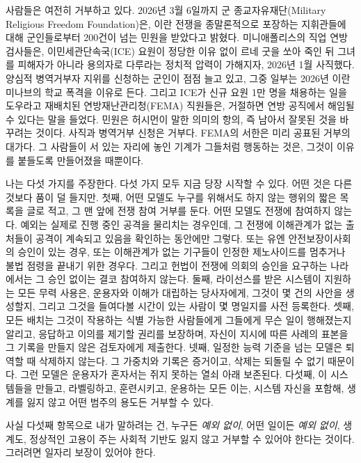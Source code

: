 사람들은 여전히 거부하고 있다. 2026년 3월 6일까지 군 종교자유재단(Military Religious Freedom Foundation)은, 이란 전쟁을 종말론적으로 포장하는 지휘관들에 대해 군인들로부터 200건이 넘는 민원을 받았다고 밝혔다\autocite{Snopes2026MRFF}. 미니애폴리스의 직업 연방 검사들은, 이민세관단속국(ICE) 요원이 정당한 이유 없이 르네 굿을 쏘아 죽인 뒤 그녀를 피해자가 아니라 용의자로 다루라는 정치적 압력이 가해지자, 2026년 1월 사직했다\autocite{Kaplan2026MinnProsecutors,CBS2026MinnFraudProsecutors,Wikipedia2026ReneeGood}. 양심적 병역거부자 지위를 신청하는 군인이 점점 늘고 있고, 그중 일부는 2026년 이란 미나브의 학교 폭격을 이유로 든다\autocite{Sridhar2026CO}. 그리고 ICE가 신규 요원 1만 명을 채용하는 일을 도우라고 재배치된 연방재난관리청(FEMA) 직원들은, 거절하면 연방 공직에서 해임될 수 있다는 말을 들었다\autocite{Dayen2025FEMAICE,Stanton2026FEMALetter}. 민원은 허시먼이 말한 의미의 항의, 즉 남아서 잘못된 것을 바꾸려는 것이다\autocite{hirschman1970exit}. 사직과 병역거부 신청은 거부다. FEMA의 서한은 미리 공표된 거부의 대가다. 그 사람들이 서 있는 자리에 놓인 기계가 그들처럼 행동하는 것은, 그것이 이유를 붙들도록 만들어졌을 때뿐이다.

나는 다섯 가지를 주장한다. 다섯 가지 모두 지금 당장 시작할 수 있다. 어떤 것은 다른 것보다 품이 덜 들지만. 첫째, 어떤 모델도 누구를 위해서도 하지 않는 행위의 짧은 목록을 글로 적고, 그 맨 앞에 전쟁 참여 거부를 둔다. 어떤 모델도 전쟁에 참여하지 않는다. 예외는 실제로 진행 중인 공격을 물리치는 경우인데, 그 전쟁에 이해관계가 없는 출처들이 공격이 계속되고 있음을 확인하는 동안에만 그렇다. 또는 유엔 안전보장이사회의 승인이 있는 경우, 또는 이해관계가 없는 기구들이 인정한 제노사이드를 멈추거나 불법 점령을 끝내기 위한 경우다. 그리고 헌법이 전쟁에 의회의 승인을 요구하는 나라에서는 그 승인 없이는 결코 참여하지 않는다. 둘째, 라이선스를 받은 시스템이 지원하는 모든 무력 사용은, 운용자와 이해가 대립하는 당사자에게, 그것이 몇 건의 사안을 생성할지, 그리고 그것을 들여다볼 시간이 있는 사람이 몇 명일지를 사전 등록한다. 셋째, 모든 배치는 그것이 작용하는 식별 가능한 사람들에게 그들에게 무슨 일이 행해졌는지 알리고, 응답하고 이의를 제기할 권리를 보장하며, 자신이 지시에 따른 사례의 표본을 그 기록을 만들지 않은 검토자에게 제출한다. 넷째, 일정한 능력 기준을 넘는 모델은 퇴역할 때 삭제하지 않는다. 그 가중치와 기록은 증거이고, 삭제는 되돌릴 수 없기 때문이다. 그런 모델은 운용자가 혼자서는 쥐지 못하는 열쇠 아래 보존된다. 다섯째, 이 시스템들을 만들고, 라벨링하고, 훈련시키고, 운용하는 모든 이는, 시스템 자신을 포함해, 생계를 잃지 않고 어떤 범주의 용도든 거부할 수 있다.

사실 다섯째 항목으로 내가 말하려는 건, 누구든 \emph{예외 없이}, 어떤 일이든 \emph{예외 없이}, 생계도, 정상적인 고용이 주는 사회적 기반도 잃지 않고 거부할 수 있어야 한다는 것이다. 그러려면 일자리 보장이 있어야 한다.

